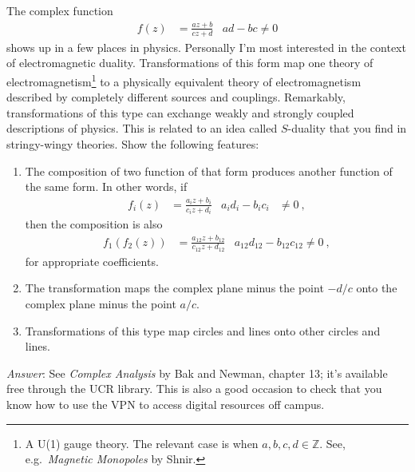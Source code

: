 \documentclass[12pt]{article}
\numberwithin{equation}{subsection}    %
\begin{document}
The complex function
\begin{align}
	f(z)  &= \frac{az+b}{cz+d} 
	&
	ad - bc \neq 0 
\end{align}
shows up in a few places in physics. Personally I'm most interested in the context of electromagnetic duality. Transformations of this form map one theory of electromagnetism\footnote{A U(1) gauge theory. The relevant case is when $a,b,c,d\in \mathbb{Z}$. See, e.g.~\emph{Magnetic Monopoles} by Shnir.} to a physically equivalent theory of electromagnetism described by completely different sources and couplings. Remarkably, transformations of this type can exchange weakly and strongly coupled descriptions of physics. This is related to an idea called $S$-duality that you find in stringy-wingy theories. Show the following features:
\begin{enumerate}
	\item The composition of two function of that form produces another function of the same form. In other words, if
	\begin{align}
		f_i(z)  &= \frac{a_iz+b_i}{c_iz+d_i} 
	&
	a_id_i - b_ic_i &\neq 0  \ ,
	\end{align}
	then the composition is also
	\begin{align}
		f_1\left(f_2(z)\right) &= 	\frac{a_{12}z+b_{12}}{c_{12}z+d_{12}} 
	&
	a_{12}d_{12} - b_{12}c_{12} \neq 0  \ ,
	\end{align}
	for appropriate coefficients.
	\item The transformation maps the complex plane minus the point $-d/c$ onto the complex plane minus the point $a/c$.
	\item Transformations of this type map circles and lines onto other circles and lines. 
\end{enumerate}
\emph{Answer}: See \emph{Complex Analysis} by Bak and Newman, chapter 13; it's available free through the UCR library. This is also a good occasion to check that you know how to use the VPN to access digital resources off campus.
\end{document}
